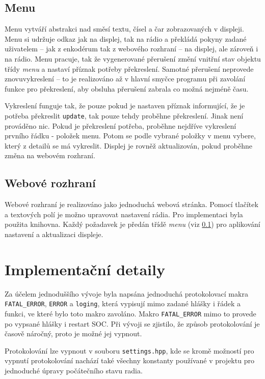 \documentclass{article}
\begin{document}
	\subsection{Menu}
	\label{menu}
	Menu vytváří abstrakci nad směsí textu, čísel a čar zobrazovaných v displeji. Menu si udržuje odkaz jak na displej, tak na rádio a překládá pokyny zadané uživatelem -- jak z enkodérum tak z webového rozhraní -- na displej, ale zároveň i na rádio. Menu pracuje, tak že vygenerované přerušení změní vnitřní stav objektu třídy \emph{menu} a nastaví příznak potřeby překreslení. Samotné přerušení neprovede znovuvykreslení -- to je realizováno až v hlavní smyčce programu při zavolání funkce pro překreslení, aby obsluha přerušení zabrala co možná nejméně času. 
	
	Vykreslení funguje tak, že pouze pokud je nastaven příznak informující, že je potřeba překreslit \verb|update|, tak pouze tehdy proběhne překreslení. Jinak není prováděno nic. Pokud je překreslení potřeba, proběhne nejdříve vykreslení prvního řádku - položek menu. Potom se podle vybrané položky v menu vybere, který z detailů se má vykreslit. Displej je rovněž aktualizován, pokud proběhne změna na webovém rozhraní. 
	
	\subsection{Webové rozhraní} 
	\label{web}
	Webové rozhraní je realizováno jako jednoduchá webová stránka. Pomocí tlačítek a textových polí je možno upravovat nastavení rádia. Pro implementaci byla použita knihovna. Každý požadavek je předán třídě  \emph{menu} (viz \ref{menu}) pro aplikování nastavení a aktualizaci displeje. 
	
	\section{Implementační detaily}
	Za účelem jednoduššího vývoje byla napsána jednoduchá protokolovací makra \verb|FATAL_ERROR|, \verb|ERROR| a \verb|loging|, která vypisují mimo zadané hlášky i řádek a funkci, ve které bylo toto makro zavoláno. Makro \verb|FATAL_ERROR| mimo to provede po vypsané hlášky i restart SOC. Při vývoji se zjistilo, že způsob protokolování je časově náročný, proto je možné jej vypnout. 
	
	Protokolování lze vypnout v souboru \texttt{settings.hpp}, kde se kromě možností pro vypnutí protokolování nachází také všechny konstanty používané v projektu pro jednoduché úpravy počátečního stavu radia.
	
\end{document}
